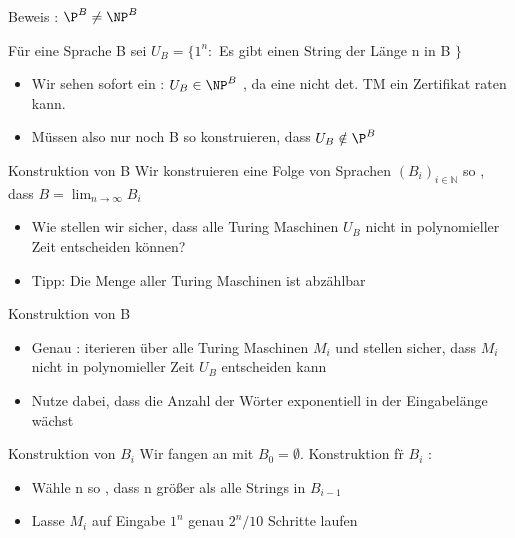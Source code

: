 \begin{frame}{Beweis : ${\P}^B \neq {\NP}^B$}
	\begin{Definition}
		Für eine Sprache B sei $U_B = \lbrace 1^n :$ Es gibt einen String
		der L\"ange n in B $\rbrace $
	\end{Definition}	
	\pause
	
	\begin{itemize}[<+->]
		\item Wir sehen sofort ein : $U_B \in {\NP}^B$ , da eine nicht det. TM
			ein Zertifikat raten kann.
		\item M\"ussen also nur noch B so konstruieren, dass $U_B \notin {\P}^B$
	\end{itemize}
\end{frame}

\begin{frame}{Konstruktion von B}
	Wir konstruieren eine Folge von Sprachen $(B_i)_{i \in \mathbb{N}}$ so , dass 
	$B = \lim_{n \to \infty} B_i$	
	\begin{itemize}[<+->]
		\item Wie stellen wir sicher, dass alle Turing Maschinen $U_B$ nicht
			in polynomieller Zeit entscheiden können?
		\item Tipp: Die Menge aller Turing Maschinen ist abzählbar
	\end{itemize}
\end{frame}

\begin{frame}{Konstruktion von B}
	\begin{itemize}[<+->]
	\item Genau : iterieren über alle Turing Maschinen $M_i$ und stellen sicher, dass
		$M_i$ nicht in polynomieller Zeit $U_B$ entscheiden kann
	\item Nutze dabei, dass die Anzahl der Wörter exponentiell in der Eingabelänge wächst
	\end{itemize}
\end{frame}

\begin{frame}{Konstruktion von $B_i$}
	Wir fangen an mit $B_0 = \emptyset$. Konstruktion f\"r $B_i$ :
	\begin{itemize}
		\item Wähle n so , dass n größer als alle Strings in $B_{i-1}$
		\item Lasse $M_i$ auf Eingabe $1^n$ genau $2^n / 10$ Schritte laufen
	\end{itemize}
\end{frame}